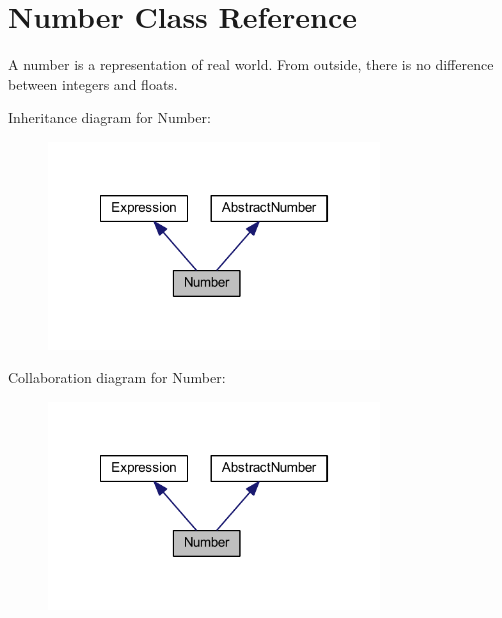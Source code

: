 \hypertarget{class_number}{\section{Number Class Reference}
\label{class_number}
}


A number is a representation of real world. From outside, there is no difference between integers and floats.  




Inheritance diagram for Number\-:\nopagebreak
\begin{figure}[H]
\begin{center}
\leavevmode
\includegraphics[width=249pt]{class_number__inherit__graph}
\end{center}
\end{figure}


Collaboration diagram for Number\-:\nopagebreak
\begin{figure}[H]
\begin{center}
\leavevmode
\includegraphics[width=249pt]{class_number__coll__graph}
\end{center}
\end{figure}
